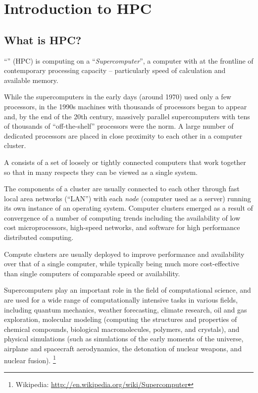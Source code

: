 \chapter{Introduction to HPC}
\label{ch:introduction-to-hpc}

\section{What is HPC?}
\label{sec:what-is-hpc}

``'' (HPC) is computing on a
``\emph{Supercomputer}'', a computer with at the frontline of contemporary
processing capacity -- particularly speed of calculation and available memory.

While the supercomputers in the early days (around 1970) used only a few
processors, in the 1990s machines with thousands of processors began to appear
and, by the end of the 20th century, massively parallel supercomputers with
tens of thousands of ``off-the-shelf'' processors were the norm. A large number
of dedicated processors are placed in close proximity to each other in a
computer cluster.

A  consists of a set of loosely or tightly connected
computers that work together so that in many respects they can be viewed as a
single system.

The components of a cluster are usually connected to each other through fast
local area networks (``LAN'') with each \emph{node} (computer used as a
server) running its own instance of an operating system. Computer clusters
emerged as a result of convergence of a number of computing trends including
the availability of low cost microprocessors, high-speed networks, and software
for high performance distributed computing.

Compute clusters are usually deployed to improve performance and availability
over that of a single computer, while typically being much more cost-effective
than single computers of comparable speed or availability.

Supercomputers play an important role in the field of computational science,
and are used for a wide range of computationally intensive tasks in various
fields, including quantum mechanics, weather forecasting, climate research, oil
and gas exploration, molecular modeling (computing the structures and
properties of chemical compounds, biological macromolecules, polymers, and
crystals), and physical simulations (such as simulations of the early moments
of the universe, airplane and spacecraft aerodynamics, the detonation of
nuclear weapons, and nuclear fusion).
\footnote{Wikipedia: \url{http://en.wikipedia.org/wiki/Supercomputer}}


